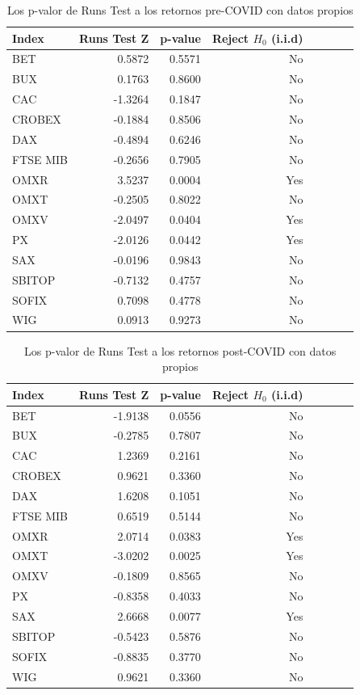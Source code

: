 \documentclass[12pt]{article}
\begin{document}
\begin{table}[H]
\centering
\small
\caption{Los p-valor de Runs Test a los retornos pre-COVID con datos propios}
\begin{tabular}{|l|r|r|r|r|r|r|r|}
\hline
\textbf{Index} & \textbf{Runs Test Z} & \textbf{p-value} & \textbf{Reject $H_0$ (i.i.d)} \\
\hline
BET & 0.5872 & 0.5571 & No \\
BUX & 0.1763 & 0.8600 & No \\
CAC & -1.3264 & 0.1847 & No \\
CROBEX & -0.1884 & 0.8506 & No \\
DAX & -0.4894 & 0.6246 & No \\
FTSE MIB & -0.2656 & 0.7905 & No \\
OMXR & 3.5237 & 0.0004 & Yes \\
OMXT & -0.2505 & 0.8022 & No \\
OMXV & -2.0497 & 0.0404 & Yes \\
PX & -2.0126 & 0.0442 & Yes \\
SAX & -0.0196 & 0.9843 & No \\
SBITOP & -0.7132 & 0.4757 & No \\
SOFIX & 0.7098 & 0.4778 & No \\
WIG & 0.0913 & 0.9273 & No \\
\hline
\end{tabular}
\end{table}

\begin{table}[H]
\centering
\small
\caption{Los p-valor de Runs Test a los retornos post-COVID con datos propios}
\begin{tabular}{|l|r|r|r|r|r|r|r|}
\hline
\textbf{Index} & \textbf{Runs Test Z} & \textbf{p-value} & \textbf{Reject $H_0$ (i.i.d)} \\
\hline
BET & -1.9138 & 0.0556 & No \\
BUX & -0.2785 & 0.7807 & No \\
CAC & 1.2369 & 0.2161 & No \\
CROBEX & 0.9621 & 0.3360 & No \\
DAX & 1.6208 & 0.1051 & No \\
FTSE MIB & 0.6519 & 0.5144 & No \\
OMXR & 2.0714 & 0.0383 & Yes \\
OMXT & -3.0202 & 0.0025 & Yes \\
OMXV & -0.1809 & 0.8565 & No \\
PX & -0.8358 & 0.4033 & No \\
SAX & 2.6668 & 0.0077 & Yes \\
SBITOP & -0.5423 & 0.5876 & No \\
SOFIX & -0.8835 & 0.3770 & No \\
WIG & 0.9621 & 0.3360 & No \\
\hline
\end{tabular}
\end{table}
\end{document}
